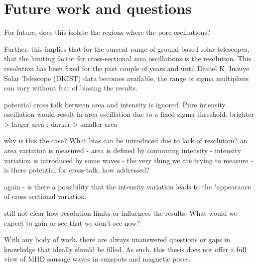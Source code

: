 \section{Future work and questions}
    
    
        For future, does this isolate the regions where the pore oscillations? 
        
      
      Further, this implies that for the current range of ground-based solar telescopes, that the limiting factor for cross-sectional area oscillations is the resolution.
      This resolution has been fixed for the past couple of years and until Daniel K. Inouye Solar Telescope (DKIST) data becomes available, the range of sigma multipliers can vary without fear of biasing the results. 
          
          
          potential cross talk between area and intensity is ignored. Pure intensity oscillation would result in area oscillation due to a fixed sigma threshold. brighter > larger area ; darker > smaller area
   
   why is this the case? What bias can be introduced due to lack of resolution?
   an area variation is measured - area is defined by contouring intensity - intensity variation is introduced by some waves - the very thing we are trying to measure - is there potential for cross-talk, how addressed?
   
   again - is there a possibility that the intensity variation leads to the "appearance of cross sectional variation.
   
   still not clear how resolution limits or influences the results. What would we expect to gain or see that we don't see now?
   
          
             
    With any body of work, there are always unanswered questions or gaps in knowledge that ideally should be filled.
    As such, this thesis does not offer a full view of MHD sausage waves in sunspots and magnetic pores.
    
